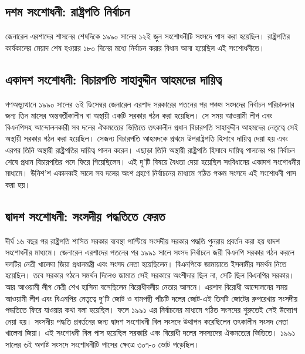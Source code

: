 \documentclass[11pt]{article}
\begin{document}
\subsection{দশম সংশোধনী: রাষ্ট্রপতি নির্বাচন}
\label{sec:org9375ff7}
জেনারেল এরশাদের শাসনের শেষদিকে ১৯৯০ সালের ১২ই জুন সংশোধনীটি
সংসদে পাস করা হয়েছিল। রাষ্ট্রপতির কার্যকালের মেয়াদ শেষ হওয়ার
১৮০ দিনের মধ্যে নির্বাচন করার বিধান আনা হয়েছিল এই সংশোধনীতে।

\subsection{একাদশ সংশোধনী: বিচারপতি সাহাবুদ্দীন আহমদের দায়িত্ব}
\label{sec:org33af6f9}
গণঅভ্যূত্থানে ১৯৯০ সালের ৬ই ডিসেম্বর জেনারেল এরশাদ সরকারের পতনের
পর পঞ্চম সংসদের নির্বাচন পরিচালনার জন্য তিন মাসের অন্তবর্তীকালীন
বা অস্থায়ী একটি সরকার গঠন করা হয়েছিল। সে সময় আওয়ামী লীগ এবং
বিএনপিসহ আন্দোলনকারী সব দলের ঐকমত্যের ভিত্তিতে তৎকালীন প্রধান
বিচারপতি সাহাবুদ্দীন আহমদের নেতৃত্বে সেই অস্থায়ী সরকার গঠন করা
হয়েছিল। সেজন্য বিচারপতি আহমদকে প্রথমে উপরাষ্ট্রপতি হিসাবে দায়িত্ব
দেয়া হয় এবং এরপর তিনি অস্থায়ী রাষ্ট্রপতির দায়িত্ব পালন করেন।
এছাড়া তিনি অস্থায়ী রাষ্ট্রপতি হিসাবে দায়িত্ব পালনের পর নির্বাচন
শেষে প্রধান বিচারপতির পদে ফিরে গিয়েছিলেন। এই দু'টি বিষয়ে বৈধতা
দেয়া হয়েছিল সংবিধানের একাদশ সংশোধনীর মাধ্যমে। উনিশ'শ একানব্বই
সালে সব দলের অংশ গ্রহণে নির্বাচনের মাধ্যমে গঠিত পঞ্চম সংসদে এই
সংশোধনী পাস করা হয়।

\subsection{দ্বাদশ সংশোধনী: সংসদীয় পদ্ধতিতে ফেরত}
\label{sec:orgbf3a6b1}
দীর্ঘ ১৬ বছর পর রাষ্ট্রপতি শাসিত সরকার ব্যবস্থা পাল্টিয়ে সংসদীয়
সরকার পদ্ধতি পুনরায় প্রবর্তন করা হয় দ্বাদশ সংশোধনীর মাধ্যমে।
জেনারেল এরশাদের পতনের পর ১৯৯১ সালে সংসদ নির্বাচনে জয়ী বিএনপি
সরকার গঠন করলে দলটির নেত্রী খালেদা জিয়া প্রধানমন্ত্রী এবং সংসদ
নেতা হয়েছিলেন। বিএনপিকে জামায়াতে ইসলামীর সমর্থন নিতে হয়েছিল।
তবে সরকার গঠনে সমর্থন দিলেও জামাত সেই সরকারে অংশীদার ছিল না,
সেটি ছিল বিএনপির সরকার। আর আওয়ামী লীগ নেত্রী শেখ হাসিনা
বসেছিলেন বিরোধীদলীয় নেতার আসনে। এরশাদ বিরোধী আন্দোলনের সময়
আওয়ামী লীগ এবং বিএনপির নেতৃত্বে দু'টি জোট ও বামপন্থী পাঁচটি দলের
জোট-এই তিনটি জোটের রুপরেখায় সংসদীয় পদ্ধতিতে ফিরে যাওয়ার কথা
বলা হয়েছিল। ফলে ১৯৯১ এর নির্বাচনের মাধ্যমে গঠিত সংসদের শুরুতেই
সেই উদ্যোগ নেয়া হয়। সংসদীয় পদ্ধতি প্রবর্তনের জন্য দ্বাদশ সংশোধনী
বিল সংসদে উত্থাপন করেছিলেন তৎকালীন সংসদ নেতা খালেদা জিয়া। এই
সংশোধনী বিল পাস হয়েছিল সরকারি এবং বিরোধী দলের সদস্যদের
ঐকমত্যের ভিত্তিতে। ১৯৯১ সালের ৬ই অগাষ্ট সংসদে সংশোধনীটি পাসের
ক্ষেত্রে ৩০৭-০ ভোট পড়েছিল।
\end{document}
